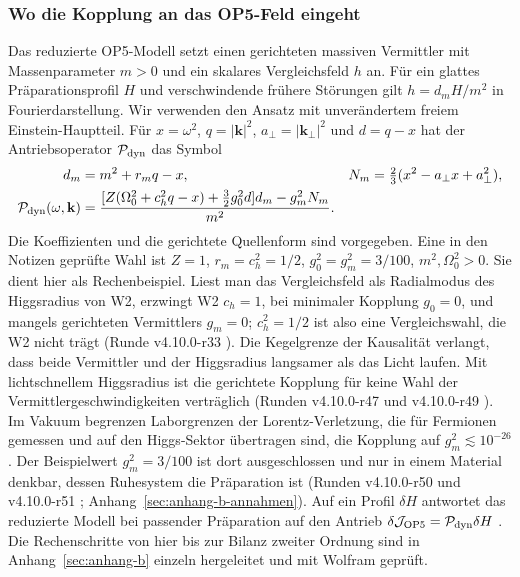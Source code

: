 \subsubsection{Wo die Kopplung an das OP5-Feld eingeht}

Das reduzierte OP5-Modell setzt einen gerichteten massiven Vermittler mit Massenparameter \(m>0\) und ein skalares Vergleichsfeld \(h\) an. Für ein glattes Präparationsprofil \(H\) und verschwindende frühere Störungen gilt \(h=d_m H/m^2\) in Fourierdarstellung. Wir verwenden den Ansatz mit unverändertem freiem Einstein-Hauptteil. Für \(x=\omega^2\), \(q=|\mathbf k|^2\), \(a_\perp=|\mathbf k_\perp|^2\) und \(d=q-x\) hat der Antriebsoperator \(\mathcal P_{\rm dyn}\) das Symbol
\begin{align}
 d_m&=m^2+r_mq-x, &
 N_m&=\tfrac23(x^2-a_\perp x+a_\perp^2),\\
 \mathcal P_{\rm dyn}(\omega,\mathbf k)
 &=\frac{[Z(\Omega_0^2+c_h^2q-x)+\tfrac32g_0^2d]d_m-g_m^2N_m}{m^2}.
 \label{eq:op5-drive}
\end{align}
Die Koeffizienten und die gerichtete Quellenform sind vorgegeben. Eine in den Notizen geprüfte Wahl ist \(Z=1\), \(r_m=c_h^2=1/2\), \(g_0^2=g_m^2=3/100\), \(m^2,\Omega_0^2>0\). Sie dient hier als Rechenbeispiel. Liest man das Vergleichsfeld als Radialmodus des Higgsradius von W2, erzwingt W2 \(c_h=1\), bei minimaler Kopplung \(g_0=0\), und mangels gerichteten Vermittlers \(g_m=0\); \(c_h^2=1/2\) ist also eine Vergleichswahl, die W2 nicht trägt (Runde v4.10.0-r33 \cite{layers}). Die Kegelgrenze der Kausalität verlangt, dass beide Vermittler und der Higgsradius langsamer als das Licht laufen. Mit lichtschnellem Higgsradius ist die gerichtete Kopplung für keine Wahl der Vermittlergeschwindigkeiten verträglich (Runden v4.10.0-r47 und v4.10.0-r49 \cite{layers}). Im Vakuum begrenzen Laborgrenzen der Lorentz-Verletzung, die für Fermionen gemessen und auf den Higgs-Sektor übertragen sind, die Kopplung auf \(g_m^2\lesssim10^{-26}\). Der Beispielwert \(g_m^2=3/100\) ist dort ausgeschlossen und nur in einem Material denkbar, dessen Ruhesystem die Präparation ist (Runden v4.10.0-r50 und v4.10.0-r51 \cite{layers}; Anhang~\ref{sec:anhang-b-annahmen}). Auf ein Profil \(\delta H\) antwortet das reduzierte Modell bei passender Präparation auf den Antrieb \(\delta\mathcal J_{\rm OP5}=\mathcal P_{\rm dyn}\delta H\) \cite{op5-channel}. Die Rechenschritte von hier bis zur Bilanz zweiter Ordnung sind in Anhang~\ref{sec:anhang-b} einzeln hergeleitet und mit Wolfram geprüft.

